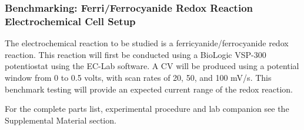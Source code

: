 \documentclass{article}
\begin{document}
\subsubsection*{Benchmarking: Ferri/Ferrocyanide Redox Reaction Electrochemical Cell Setup}

The electrochemical reaction to be studied is a ferricyanide/ferrocyanide redox reaction. This reaction will first be conducted using a BioLogic VSP-300 potentiostat using the EC-Lab software. A CV will be produced using a potential window from 0 to 0.5 volts, with scan rates of 20, 50, and 100 mV/s. This benchmark testing will provide an expected current range of the redox reaction. 

For the complete parts list, experimental procedure and lab companion see the Supplemental Material section.
\end{document}
